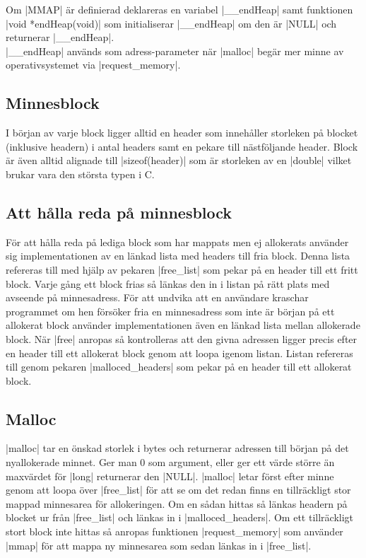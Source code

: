 \documentclass[paper=a4, fontsize=11pt]{scrartcl} %
\numberwithin{equation}{section} %
\numberwithin{figure}{section} %
\numberwithin{table}{section} %
\begin{document}
%
%
Om |MMAP| är definierad deklareras en variabel |__endHeap| samt funktionen 
|void *endHeap(void)| som initialiserar |__endHeap| om den är |NULL| och
returnerar |__endHeap|.\\

|__endHeap| används som adress-parameter när |malloc| begär mer minne av
operativsystemet via |request_memory|.

\subsection{Minnesblock}
I början av varje block ligger alltid en header som innehåller storleken på
blocket (inklusive headern) i antal headers samt en pekare till nästföljande
header.
Block är även alltid alignade till |sizeof(header)| som är storleken av en
|double| vilket brukar vara den största typen i C.

\subsection{Att hålla reda på minnesblock}

För att hålla reda på lediga block som har mappats men ej allokerats använder
sig implementationen av en länkad lista med headers till fria block.
Denna lista refereras till med hjälp av pekaren |free_list| som pekar på en
header till ett fritt block.
Varje gång ett block frias så länkas den in i listan på rätt plats med avseende
på minnesadress.
För att undvika att en användare kraschar programmet om hen försöker fria en
minnesadress som inte är början på ett allokerat block använder
implementationen även en länkad lista mellan allokerade block.
När |free| anropas så kontrolleras att den givna adressen ligger precis efter
en header till ett allokerat block genom att loopa igenom listan.
Listan refereras till genom pekaren |malloced_headers| som pekar på en header
till ett allokerat block.

\subsection{Malloc}
|malloc| tar en önskad storlek i bytes och returnerar adressen till början på
det nyallokerade minnet.
Ger man 0 som argument, eller ger ett värde större än maxvärdet för |long|
returnerar den |NULL|.
|malloc| letar först efter minne genom att loopa över |free_list| för att se om
det redan finns en tillräckligt stor mappad minnesarea för allokeringen.
Om en sådan hittas så länkas headern på blocket ur från |free_list| och länkas
in i |malloced_headers|.
Om ett tillräckligt stort block inte hittas så anropas funktionen
|request_memory| som använder |mmap| för att mappa ny minnesarea som sedan
länkas in i |free_list|.
\end{document}
